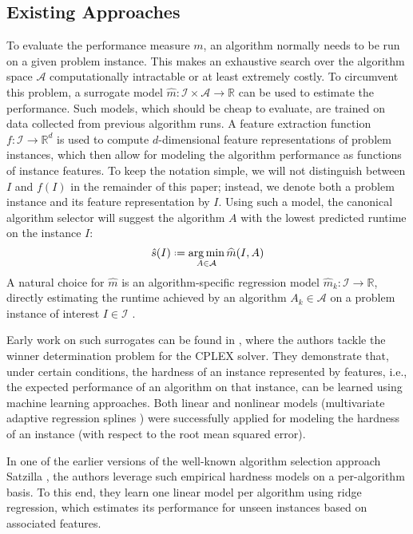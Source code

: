 \documentclass[runningheads]{llncs}
\DeclareMathOperator*{\argmin}{arg\,min}
\newcommand*{\defeq}{\mathrel{\vcenter{\baselineskip0.5ex \lineskiplimit0pt
			\hbox{\footnotesize.}\hbox{\footnotesize.}}}%
	=}
\begin{document}
\subsection{Existing Approaches}
To evaluate the performance measure $m$, an algorithm normally needs to be run on a given problem instance. This makes an exhaustive search over the algorithm space $\mathcal{A}$ computationally intractable or at least extremely costly. To circumvent this problem, a surrogate model $\widehat{m}: \mathcal{I} \times \mathcal{A} \to \mathbb{R}$ can be used to estimate the performance. Such models, which should be cheap to evaluate, are trained on data collected from previous algorithm runs. A feature extraction function $f \colon \mathcal{I} \to \mathbb{R}^d$ is used to compute $d$-dimensional feature representations of problem instances, which then allow for modeling the algorithm performance as functions of instance features. To keep the notation simple, we will not distinguish between $I$ and $f(I)$ in the remainder of this paper; instead, we denote both a problem instance and its feature representation by $I$. Using such a model, the canonical algorithm selector will suggest the algorithm $A$ with the lowest predicted runtime on the instance $I$:
\begin{equation}
    \hat{s}(I) \defeq \argmin_{A \in \mathcal{A}} \widehat{m}(I,A)
\end{equation}
A natural choice for $\widehat{m}$ is an algorithm-specific regression model $\widehat{m}_k \colon \mathcal{I} \to \mathbb{R}$, directly estimating the runtime achieved by an algorithm $A_k \in \mathcal{A}$ on a problem instance of interest $I \in \mathcal{I}$ \cite{hutter_algorithm_2012}.

Early work on such surrogates can be found in \cite{leyton2002learning}, where the authors tackle the winner determination problem for the CPLEX solver. They demonstrate that, under certain conditions, the hardness of an instance represented by features, i.e., the expected performance of an algorithm on that instance, can be learned using machine learning approaches. Both linear and nonlinear models (multivariate adaptive regression splines \cite{friedman1991multivariate}) were successfully applied for modeling the hardness of an instance (with respect to the root mean squared error).

In one of the earlier versions of the well-known algorithm selection approach Satzilla \cite{xu2008satzilla}, the authors leverage such empirical hardness models on a per-algorithm basis. To this end, they learn one linear model per algorithm using ridge regression, which estimates its performance for unseen instances based on associated features.
\end{document}
